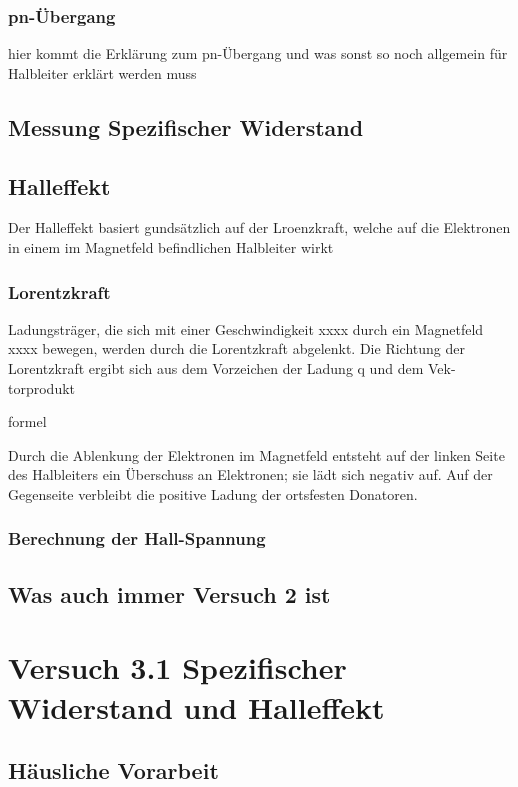\documentclass[a4paper]{scrartcl}
\numberwithin{equation}{subsection}
\begin{document}
\subsubsection{pn-Übergang}
hier kommt die Erklärung zum pn-Übergang und was sonst so noch allgemein für Halbleiter erklärt werden muss

\subsection{Messung Spezifischer Widerstand}

\subsection{Halleffekt}
Der Halleffekt basiert gundsätzlich auf der Lroenzkraft, welche auf die Elektronen in einem im Magnetfeld befindlichen Halbleiter wirkt

\subsubsection{Lorentzkraft}
Ladungsträger, die sich mit einer Geschwindigkeit xxxx durch ein Magnetfeld xxxx bewegen, werden
durch die Lorentzkraft abgelenkt. 
Die Richtung der Lorentzkraft ergibt sich aus dem Vorzeichen der Ladung q und dem Vek-
torprodukt

formel

Durch die Ablenkung der Elektronen im Magnetfeld entsteht auf der linken Seite des Halbleiters
ein Überschuss an Elektronen; sie lädt sich negativ auf. Auf der Gegenseite verbleibt die positive
Ladung der ortsfesten Donatoren. 

\subsubsection{Berechnung der Hall-Spannung}

\subsection{Was auch immer Versuch 2 ist}

\newpage

\section{Versuch 3.1 Spezifischer Widerstand und Halleffekt}
\subsection{Häusliche Vorarbeit}
\end{document}
